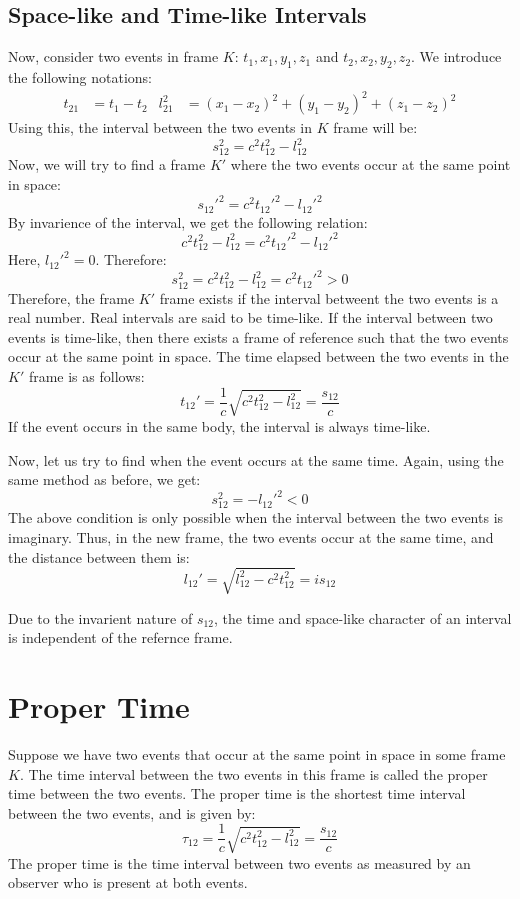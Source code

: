 \documentclass[12pt, oneside]{book}
\begin{document}
\subsection{Space-like and Time-like Intervals}
Now, consider two events in frame \(K\): \(t_1,x_1,y_1,z_1\) and \(t_2,x_2,y_2,z_2\).
We introduce the following notations:
\begin{align*}
t_{21} &= t_1 - t_2 &
l_{21}^2 &= (x_1 - x_2)^2 + (y_1 - y_2)^2 + (z_1 - z_2)^2
\end{align*}
Using this, the interval between the two events in \(K\) frame will be:
\[s_{12}^2 = c^2t_{12}^2 - l_{12}^2\]
Now, we will try to find a frame \(K'\) where the two events occur at the same point in space:
\[s_{12}'^2 = c^2t_{12}'^2 - l_{12}'^2\]
By invarience of the interval, we get the following relation:
\[c^2t_{12}^2 - l_{12}^2 = c^2t_{12}'^2 - l_{12}'^2\]
Here, \(l_{12}'^2 = 0\). Therefore:
\[s_{12}^2 = c^2t_{12}^2 - l_{12}^2 = c^2t_{12}'^2 > 0 \]
Therefore, the frame \(K'\) frame exists if the interval betweent the two events is a real number. Real intervals are said to be time-like.
If the interval between two events is time-like, then there exists a frame of reference such that the two events occur at the same point in space.
The time elapsed between the two events in the \(K'\) frame is as follows:
\[t_{12}' = \frac{1}{c}\sqrt{c^2t_{12}^2 - l_{12}^2} = \frac{s_12}{c}\]
If the event occurs in the same body, the interval is always time-like. 

Now, let us try to find when the event occurs at the same time.
Again, using the same method as before, we get:
\[s_{12}^2 = -l_{12}'^2 < 0\]
The above condition is only possible when the interval between the two events is imaginary.
Thus, in the new frame, the two events occur at the same time, and the distance between them is:
\[l_{12}' = \sqrt{l_{12}^2 - c^2 t_{12}^2} = is_{12}\]

Due to the invarient nature of \(s_{12}\), the time and space-like character of an interval is independent of the refernce frame.

\section{Proper Time}
Suppose we have two events that occur at the same point in space in some frame \(K\).
The time interval between the two events in this frame is called the proper time between the two events.
The proper time is the shortest time interval between the two events, and is given by:
\[\tau_{12} = \frac{1}{c}\sqrt{c^2t_{12}^2 - l_{12}^2} = \frac{s_{12}}{c}\]
The proper time is the time interval between two events as measured by an observer who is present at both events.
\end{document}
